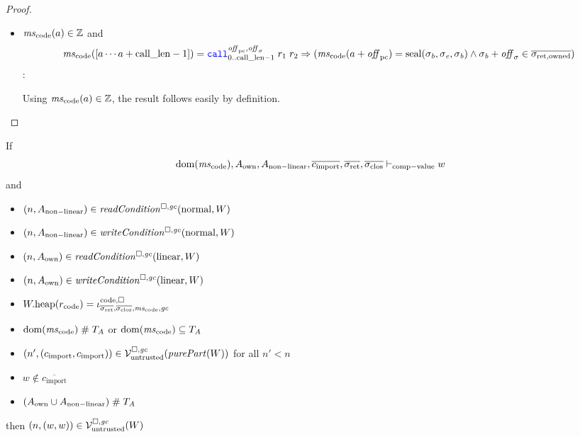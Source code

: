 \documentclass[a4paper]{article}
\begin{document}
\begin{proof}
\begin{itemize}
  \item $\mscode(a) \in \ints$ and
    \begin{equation*}
      \mscode([a \cdots a + \calllen-1]) = \scall[0..\calllen-1]{\offpc,\offsigma}{r_1}{r_2} \Rightarrow (\mscode(a+\offpc) = \seal{\sigma_\baddr,\sigma_\eaddr,\sigma_\baddr} \wedge \sigma_\baddr+\offsigma \in \sigrets[\mathrm{owned}])
    \end{equation*}:

    Using $\mscode(a) \in \ints$, the result follows easily by definition.
  \end{itemize}
\end{proof}

\begin{lemma}
  \label{lem:ftlr-comp-value}
  If
  \begin{equation*}
    \dom(\mscode), A_{\mathrm{own}}, A_{\mathrm{non-linear}}, \overline{c_{\mathrm{import}}}, \sigrets,\sigcloss \vdash_{\mathrm{comp-value}} w
  \end{equation*}
  and
  \begin{itemize}
  \item $\npair{A_{\mathrm{non-linear}}} \in \readCond{\normal,W}$
  \item $\npair{A_{\mathrm{non-linear}}} \in \writeCond{\normal,W}$
  \item $\npair{A_{\mathrm{own}}} \in \readCond{\linear,W}$
  \item $\npair{A_{\mathrm{own}}} \in \writeCond{\linear,W}$
  \item $\pwheap(r_{\mathrm{code}}) = \codereg{\sigrets,\sigcloss,\mscode,\gc}$
  \item $\dom(\mscode) \mathrel{\#} \ta$ or $\dom(\mscode) \subseteq \ta$
  \item $\npair[n']{(c_{\mathrm{import}},c_{\mathrm{import}})} \in \lrv(\purePart{W})$ for all $n' < n$
  \item $w \not\in \overline{c_{\mathrm{import}}}$
  \item $(A_{\mathrm{own}} \cup A_{\mathrm{non-linear}}) \mathrel{\#} T_{A}$
  \end{itemize}

  then $\left(n,(w,w)\right) \in \mathcal{V}^{\square,\mathit{gc}}_{\mathrm{untrusted}}(W)$
\end{lemma}
\end{document}
